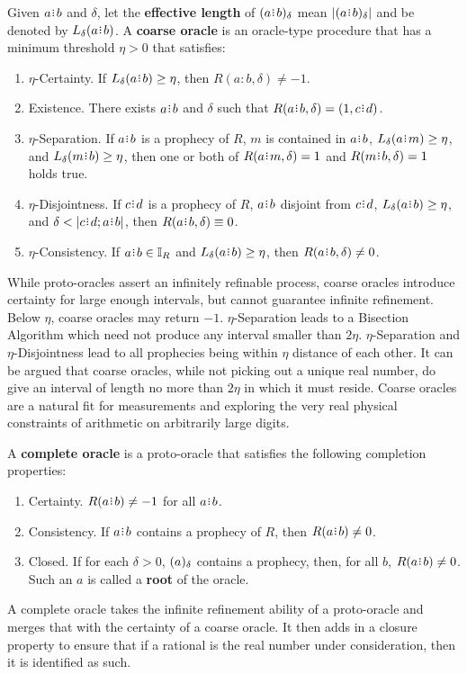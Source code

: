 \documentclass[12pt]{article}
\begin{document}
Given $a \rint b$ and $\delta$, let the \textbf{effective length} of $\halo{a \rint b}$ mean $|\halo{a \rint b}|$ and be denoted by $\efflen{a \rint b}$. A \textbf{coarse oracle} is an oracle-type procedure that has a minimum threshold $\eta > 0$ that satisfies: 
\begin{enumerate}
    \item $\eta$-Certainty. If $\efflen{a \rint b} \geq \eta$, then $R(a:b, \delta) \neq -1$.
    \item Existence. There exists $a \rint b$ and $\delta$ such that $R(a \rint b, \delta) = (1, c\rint d)$. 
    \item $\eta$-Separation. If $a\rint b$ is a prophecy of $R$, $m$ is contained in $a\rint b$, $\efflen{a \rint m} \geq \eta$, and $\efflen{m \rint b} \geq \eta$, then one or both of $R(a \rint m, \delta) =1$  and $R(m \rint b, \delta) = 1$ holds true. 
   \item $\eta$-Disjointness. If $c\rint d$ is a prophecy of $R$, $a \rint b$ disjoint from $c \rint d$, $\efflen{a\rint b} \geq \eta$, and $\delta < |c \rint d; a\rint b|$, then $R(a\rint b, \delta) \equiv 0$.
   \item $\eta$-Consistency. If $a\rint b \in \mathbb{I}_R$ and $\efflen{a \rint b}\geq \eta$, then $R(a \rint b, \delta) \neq 0$.
\end{enumerate}
While proto-oracles assert an infinitely refinable process, coarse oracles introduce certainty for large enough intervals, but cannot guarantee infinite refinement. Below $\eta$, coarse oracles may return $-1$. $\eta$-Separation leads to a Bisection Algorithm which need not produce any interval smaller than $2\eta$. $\eta$-Separation and $\eta$-Disjointness lead to all prophecies being within $\eta$ distance of each other. It can be argued that coarse oracles, while not picking out a unique real number, do give an interval of length no more than $2 \eta$ in which it must reside. Coarse oracles are a natural fit for measurements and exploring the very real physical constraints of arithmetic on arbitrarily large digits. 


A \textbf{complete oracle} is a proto-oracle that satisfies the following completion properties: 
\begin{enumerate}
    \item Certainty. $R(a \rint b) \neq -1$ for all $a\rint b$. 
    \item Consistency. If $a\rint b$ contains a prophecy of $R$, then $R(a\rint b) \neq 0$. 
    \item Closed. If for each $\delta >0$, $(a)_{\delta}$ contains a prophecy, then, for all $b$, $R(a\rint b) \neq 0$. Such an $a$ is called a \textbf{root} of the oracle. 
\end{enumerate}
A complete oracle takes the infinite refinement ability of a proto-oracle and merges that with the certainty of a coarse oracle. It then adds in a closure property to ensure that if a rational is the real number under consideration, then it is identified as such. 
\end{document}
